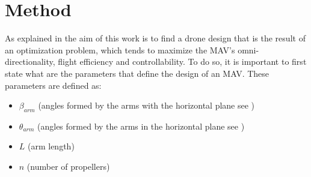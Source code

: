 \chapter{Method}
\label{sec:method}
As explained in  the aim of this work is to find a drone
design that is the result of an optimization problem, which tends to maximize the
MAV's omni-directionality, flight efficiency and controllability. To do so, it is
important to first state what are the parameters that define the design of an MAV.
These parameters are defined as:

\begin{itemize}
\item $\beta_{arm}$  (angles formed by the arms with the horizontal plane see )
\item $\theta_{arm}$ (angles formed by the arms in the horizontal plane see )
\item $L$ (arm length)
\item $n$ (number of propellers)
\end{itemize}

